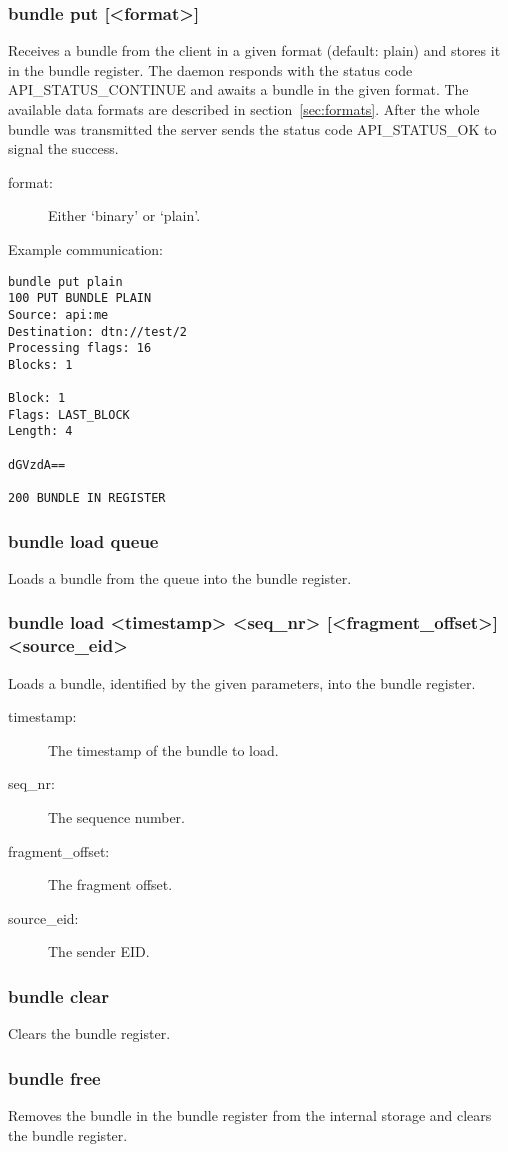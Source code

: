 \documentclass[12pt, a4paper]{scrartcl}
\begin{document}
\subsubsection*{bundle put [<format>]}
Receives a bundle from the client in a given format (default: plain) and stores it in the bundle register.
The daemon responds with the status code API\_STATUS\_CONTINUE and awaits a bundle in the given format.
The available data formats are described in section~\ref{sec:formats}.
After the whole bundle was transmitted the server sends the status code API\_STATUS\_OK to signal the success.
\begin{description}
\item[format:] Either `binary' or `plain'.
\end{description}
Example communication:\\
\makebox[\textwidth]{\hrulefill}
\begin{verbatim}
bundle put plain
100 PUT BUNDLE PLAIN
Source: api:me
Destination: dtn://test/2
Processing flags: 16
Blocks: 1

Block: 1
Flags: LAST_BLOCK
Length: 4

dGVzdA==

200 BUNDLE IN REGISTER
\end{verbatim}
\makebox[\textwidth]{\hrulefill}
\subsubsection*{bundle load queue}
Loads a bundle from the queue into the bundle register.
\subsubsection*{bundle load <timestamp> <seq\_nr> [<fragment\_offset>] <source\_eid>}
Loads a bundle, identified by the given parameters, into the bundle register.
\begin{description}
\item[timestamp:] The timestamp of the bundle to load.
\item[seq\_nr:] The sequence number.
\item[fragment\_offset:] The fragment offset.
\item[source\_eid:] The sender EID.
\end{description}
\subsubsection*{bundle clear}
Clears the bundle register.
\subsubsection*{bundle free}
Removes the bundle in the bundle register from the internal storage and clears the bundle register.
\end{document}
